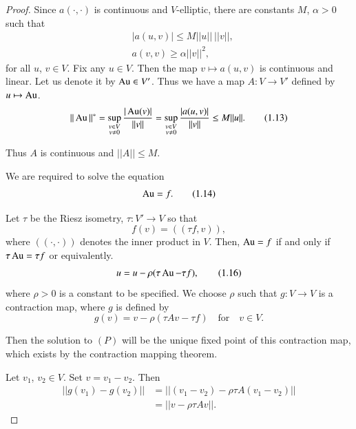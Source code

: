 \begin{proof}
Since $a(\cdot,\cdot)$ is continuous and $V$-elliptic, there are
constants $M$, $\alpha>0$ such that
\begin{equation*}
\begin{split}
& |a(u,v)|\leq M||u||~||v||,\\
& a(v,v)\geq\alpha||v||^{2},
\end{split}\tag{1.12}\label{chap1-eq1.12}
\end{equation*}
for all $u$, $v\in V$. Fix any $u\in V$. Then the map $v\mapsto
a(u,v)$ is continuous and linear. Let us denote it by $\operatorname{Au}\in V'$. Thus
we have a map $A:V\to V'$ defined by $u\mapsto \operatorname{Au}$.
\begin{equation*}
||\operatorname{Au}||^{\ast} =\sup_{\substack{v\in V\\ v\neq
    0}}\frac{|\operatorname{Au}(v)|}{||v||}=\sup_{\substack{v\in V\\ v\neq
    0}}\frac{|a(u,v)|}{||v||}\leq
M||u||.\tag{1.13}\label{chap1-eq1.13} 
\end{equation*}

Thus $A$ is continuous and $||A||\leq M$.

We are required to solve the equation
\begin{equation*}
\operatorname{Au}=f.\tag{1.14}\label{chap1-eq1.14}
\end{equation*}

Let $\tau$ be the Riesz isometry, $\tau:V'\to V$ so that
\begin{equation*}
f(v)=((\tau f,v)),\tag{1.15}\label{chap1-eq1.15}
\end{equation*}
where $((\cdot,\cdot))$ denotes the inner product in $V$. Then,
$\operatorname{Au}=f$ if and only if $\tau \operatorname{Au}=\tau f$ or equivalently.
\begin{equation*}
u=u-\rho(\tau \operatorname{Au}-\tau f),\tag{1.16}\label{chap1-eq1.16}
\end{equation*}\pageoriginale
where $\rho>0$ is a constant to be specified. We choose $\rho$ such
that $g:V\to V$ is a contraction map, where $g$ is defined by
\begin{equation*}
g(v)=v-\rho(\tau Av-\tau f)\quad\text{for}\quad v\in
V.\tag{1.17}\label{chap1-eq1.17} 
\end{equation*}

Then the solution to $(P)$ will be the unique fixed point of this
contraction map, which exists by the contraction mapping theorem.

Let $v_{1}$, $v_{2}\in V$. Set $v=v_{1}-v_{2}$. Then
\begin{align*}
||g(v_{1})-g(v_{2})|| &= ||(v_{1}-v_{2})-\rho\tau A(v_{1}-v_{2})||\\
&= ||v-\rho \tau Av||.
\end{align*}


\end{proof}
